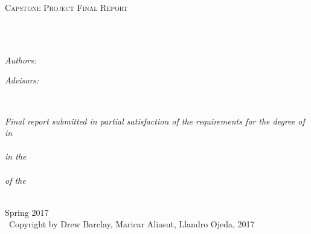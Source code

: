 \documentclass[
11pt, %
oneside, %
english, %
onehalfspacing, %
nolistspacing, %
hidelinks, %
headsepline, %
consistentlayout, %
table, %
]{MastersDoctoralThesis} %
\begin{document}
\begin{titlepage}
\begin{center}

\vspace*{.06\textheight}
\textsc{\Large Capstone Project Final Report}\\[0.5cm] %

\HRule \\[0.4cm] %
{\huge \bfseries \ttitle\par}\vspace{0.4cm} %
\HRule \\[1.5cm] %
 
\begin{minipage}[t]{0.4\textwidth}
\begin{flushleft} \large
\emph{Authors:}\\
{\authorname} %
\end{flushleft}
\end{minipage}
\begin{minipage}[t]{0.4\textwidth}
\begin{flushright} \large
\emph{Advisors:} \\
{\supname} %
\end{flushright}
\end{minipage}\\[3cm]
 
\vfill

\large \textit{Final report submitted in partial satisfaction of the requirements for the degree of \degreename}\\[0.3cm] %
\textit{in}\\[0.4cm]
\deptname\\[0.4cm] %
\textit{in the}\\[0.4cm]
\facname \\[0.4cm]
\textit{of the}\\[0.4cm]
\univname\\
 
\vspace*{\fill}

{\large Spring 2017}\\

{\small \textcopyright \, Copyright by Drew Barclay, Maricar Aliasut, Llandro Ojeda, 2017}\\
 
\vfill
\end{center}
\end{titlepage}
\end{document}
